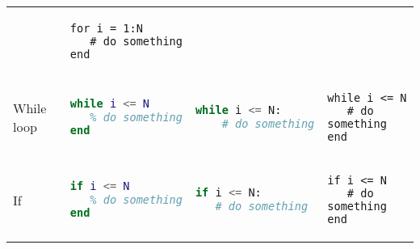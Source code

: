 \documentclass[10pt, landscape]{article}
\begin{document}
\begin{multicols}{2}
\begin{tabular}[]{@{}llll@{}}
\begin{minipage}[t]{0.22\columnwidth}
\end{minipage} & \begin{minipage}[t]{0.25\columnwidth}\raggedright
\begin{lstlisting}
for i = 1:N
   # do something
end
\end{lstlisting}

\end{minipage}\tabularnewline
\begin{minipage}[t]{0.19\columnwidth}\raggedright
While loop
\end{minipage} & \begin{minipage}[t]{0.22\columnwidth}\raggedright
\begin{lstlisting}[language=Matlab]
while i <= N
   % do something
end
\end{lstlisting}

\end{minipage} & \begin{minipage}[t]{0.22\columnwidth}\raggedright
\begin{lstlisting}[language=Python]
while i <= N:
    # do something
\end{lstlisting}

\end{minipage} & \begin{minipage}[t]{0.25\columnwidth}\raggedright
\begin{lstlisting}
while i <= N
   # do something
end
\end{lstlisting}

\end{minipage}\tabularnewline
\begin{minipage}[t]{0.19\columnwidth}\raggedright
If
\end{minipage} & \begin{minipage}[t]{0.22\columnwidth}\raggedright
\begin{lstlisting}[language=Matlab]
if i <= N
   % do something
end
\end{lstlisting}

\end{minipage} & \begin{minipage}[t]{0.22\columnwidth}\raggedright
\begin{lstlisting}[language=Python]
if i <= N:
   # do something
\end{lstlisting}

\end{minipage} & \begin{minipage}[t]{0.25\columnwidth}\raggedright
\begin{lstlisting}
if i <= N
   # do something
end
\end{lstlisting}


\end{minipage}
\end{tabular}
\end{multicols}
\end{document}
